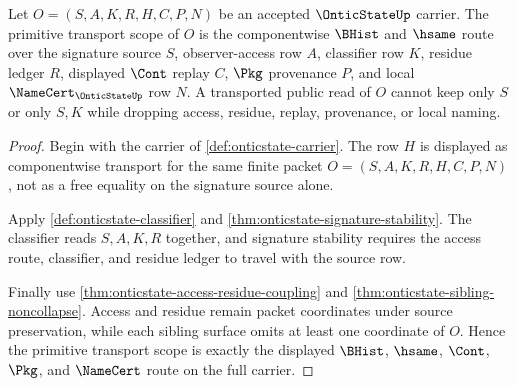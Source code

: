 \begin{theorem}
\label{thm:onticstate-transport-scope}
Let $O=(S,A,K,R,H,C,P,N)$ be an accepted $\OnticStateUp$ carrier. The primitive transport scope of $O$ is the componentwise $\BHist$ and $\hsame$ route over the signature source $S$, observer-access row $A$, classifier row $K$, residue ledger $R$, displayed $\Cont$ replay $C$, $\Pkg$ provenance $P$, and local $\NameCert_{\OnticStateUp}$ row $N$. A transported public read of $O$ cannot keep only $S$ or only $S,K$ while dropping access, residue, replay, provenance, or local naming.
\end{theorem}
\begin{proof}
Begin with the carrier of \autoref{def:onticstate-carrier}. The row $H$ is displayed as componentwise transport for the same finite packet $O=(S,A,K,R,H,C,P,N)$, not as a free equality on the signature source alone.

Apply \autoref{def:onticstate-classifier} and \autoref{thm:onticstate-signature-stability}. The classifier reads $S,A,K,R$ together, and signature stability requires the access route, classifier, and residue ledger to travel with the source row.

Finally use \autoref{thm:onticstate-access-residue-coupling} and \autoref{thm:onticstate-sibling-noncollapse}. Access and residue remain packet coordinates under source preservation, while each sibling surface omits at least one coordinate of $O$. Hence the primitive transport scope is exactly the displayed $\BHist$, $\hsame$, $\Cont$, $\Pkg$, and $\NameCert$ route on the full carrier.
\end{proof}

